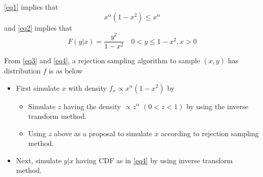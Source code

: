 \documentclass{article}\usepackage[]{graphicx}\usepackage[]{color}
\begin{document}
\eqref{eq1} implies that
\begin{equation}\label{eq3}
x^\alpha (1-x^2) \leq x^\alpha
\end{equation}
and \eqref{eq2} implies that
\begin{equation}\label{eq4}
F(y|x) = \frac{y^2}{1-x^2} \quad  0<y\leq 1-x^2, x>0
\end{equation}

From \eqref{eq3} and \eqref{eq4}, a rejection sampling algorithm to sample $(x,y)$ has distribution $f$ is as below

\begin{itemize}
\item First simulate $x$ with density $f_x \propto x^\alpha (1-x^2)$ by 

\begin{itemize}
 \item Simulate $z$ having the density $\propto z^\alpha$ $(0<z<1)$ by using the inverse transform method.
\item Using $z$ above as a proposal to simulate $x$ according to rejection sampling method.
\end{itemize}
\item Next, simulate $y|x$ having CDF as in \eqref{eq4} by using inverse transform method.
\end{itemize}
\end{document}
